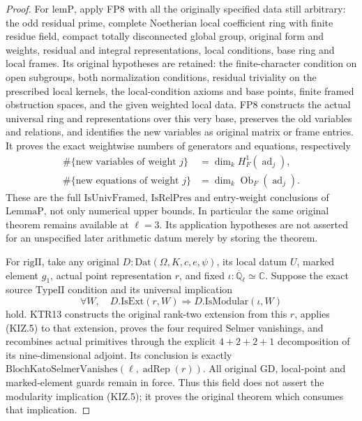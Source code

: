 \documentclass[11pt,a4paper]{article}
\numberwithin{equation}{section}
\theoremstyle{remark}\newtheorem{remark}[theorem]{Remark}
\begin{document}
\begin{proof}
For \(\mathrm{lemP}\), apply FP8 with all the originally
specified data still arbitrary: the odd residual prime, complete
Noetherian local coefficient ring with finite residue field,
compact totally disconnected global group, original form and
weights, residual and integral representations, local conditions,
base ring and local frames.  Its original hypotheses are retained:
the finite-character condition on open subgroups, both normalization
conditions, residual triviality on the prescribed local kernels,
the local-condition axioms and base points, finite framed
obstruction spaces, and the given weighted local data.
FP8 constructs the actual universal ring and representations over
this very base, preserves the old variables and relations, and
identifies the new variables as original matrix or frame entries.
It proves the exact weightwise numbers of generators and equations,
respectively
\[
 \begin{aligned}
 \#\{\text{new variables of weight }j\}
      &=\dim_k H^1_F(\operatorname{ad}_j),\\
 \#\{\text{new equations of weight }j\}
      &=\dim_k\operatorname{Ob}_F(\operatorname{ad}_j).
 \end{aligned}
 \tag{KIZ.4}
\]
These are the full \(\mathrm{IsUnivFramed}\),
\(\mathrm{IsRelPres}\) and entry-weight conclusions of
\(\mathrm{LemmaP}\), not only numerical upper bounds.
In particular the same original theorem remains available at
\(\ell=3\).  Its application hypotheses are not asserted for
an unspecified later arithmetic datum merely by storing the theorem.

For \(\mathrm{rigII}\), take any original
\(D:\mathrm{Dat}(\Omega,K,c,e,\psi)\), its local datum
\(U\), marked element \(g_1\), actual point representation
\(r\), and fixed \(\iota:\overline{\mathbb Q}_\ell\simeq
\mathbb C\).  Suppose the exact source \(\mathrm{TypeII}\)
condition and its universal implication
\[
 \forall W,\quad D.\mathrm{IsExt}(r,W)
                  \Longrightarrow D.\mathrm{IsModular}(\iota,W)
 \tag{KIZ.5}
\]
hold.  KTR13 constructs the original rank-two extension from this
\(r\), applies (KIZ.5) to that extension, proves the four required
Selmer vanishings, and recombines actual primitives through the
explicit \(4+2+2+1\) decomposition of its nine-dimensional
adjoint.  Its conclusion is exactly
\(\mathrm{BlochKatoSelmerVanishes}(\ell,\operatorname{adRep}(r))\).
All original \(\mathrm{GD}\), local-point and marked-element
guards remain in force.  Thus this field does not assert the
modularity implication (KIZ.5); it proves the original theorem
which consumes that implication.


\end{proof}
\end{document}
